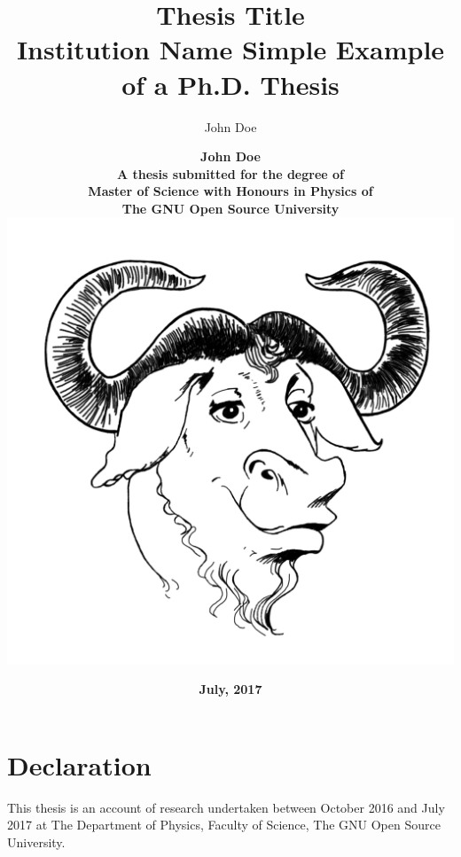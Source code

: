 \documentclass[12pt]{report}
\title{
	{\Huge{\bfseries Thesis Title}}\\
	{\large Institution Name}
}
\author{John Doe}
\begin{document}
\begin{titlepage}
\title{\textbf{Simple Example of a Ph.D. Thesis}\\[1cm]}
\author{\textbf{John Doe}\\[3cm]
\textbf{A thesis submitted for the degree of}\\
\textbf{Master of Science with Honours in Physics of} \\
\textbf{The GNU Open Source University}\\[1cm]
\includegraphics[height=0.2\textheight,keepaspectratio]{gnu.png}\\[1cm]
}
\date{
\textbf{July, 2017}
}
\maketitle
\end{titlepage}
\sloppy
 
\chapter*{Declaration}
This thesis is an account of research undertaken between October 2016 and 
July 2017 at The Department of Physics, Faculty of Science, 
The GNU Open Source University.
\end{document}
